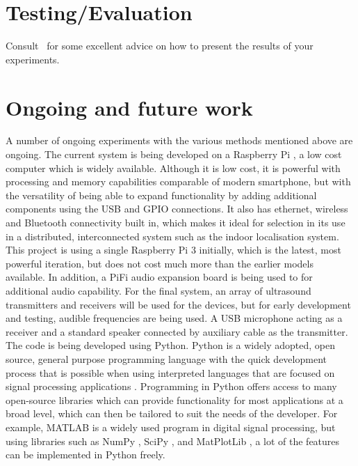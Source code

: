 \documentclass[]{final_report}
\begin{document}
\chapter{\label{chapter5}  Testing/Evaluation}


 Consult~\cite{xiao2016survey} for some excellent advice on how to present the results of your experiments.

\chapter{\label{chapter6}  Ongoing and future work}

A number of ongoing experiments with the various methods mentioned above are ongoing. The current system is being developed on a Raspberry Pi \cite{pi2013raspberry}, a low cost computer which is widely available. Although it is low cost, it is powerful with processing and memory capabilities comparable of modern smartphone, but with the versatility of being able to expand functionality by adding additional components using the USB and GPIO connections. It also has ethernet, wireless and Bluetooth connectivity built in, which makes it ideal for selection in its use in a distributed, interconnected system such as the indoor localisation system.
This project is using a single Raspberry Pi 3 initially, which is the latest, most powerful iteration, but does not cost much more than the earlier models available. In addition, a PiFi audio expansion board is being used to for additional audio capability. For the final system, an array of ultrasound transmitters and receivers will be used for the devices, but for early development and testing, audible frequencies are being used. A USB microphone acting as a receiver and a standard speaker connected by auxiliary cable as the transmitter. 
The code is being developed using Python. Python is a widely adopted, open source, general purpose programming language with the quick development process that is possible when using interpreted languages that are focused on signal processing applications \cite{glover2011python}. Programming in Python offers access to many open-source libraries which can provide functionality for most applications at a broad level, which can then be tailored to suit the needs of the developer. For example, MATLAB is a widely used program in digital signal processing, but using libraries such as NumPy \cite{oliphant2006guide}, SciPy \cite{jones2014scipy}, and MatPlotLib \cite{hunter2007matplotlib}, a lot of the features can be implemented in Python freely. 
\end{document}
